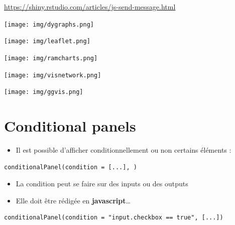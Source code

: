 \documentclass[
]{article}
\providecommand{\tightlist}{%
  \setlength{\itemsep}{0pt}\setlength{\parskip}{0pt}}
\begin{document}
\url{https://shiny.rstudio.com/articles/js-send-message.html}

\texttt{[image: img/dygraphs.png]}

\texttt{[image: img/leaflet.png]}

\texttt{[image: img/ramcharts.png]}

\texttt{[image: img/visnetwork.png]}

\texttt{[image: img/ggvis.png]}

\hypertarget{conditional-panels}{%
\section{Conditional panels}\label{conditional-panels}}

\begin{itemize}
\tightlist
\item
  Il est possible d'afficher conditionnellement ou non certains éléments
  :
\end{itemize}

\begin{verbatim}
conditionalPanel(condition = [...], )
\end{verbatim}

\begin{itemize}
\tightlist
\item
  La condition peut se faire sur des inputs ou des outputs
\item
  Elle doit être rédigée en \textbf{javascript}\ldots{}
\end{itemize}

\begin{verbatim}
conditionalPanel(condition = "input.checkbox == true", [...])
\end{verbatim}
\end{document}
